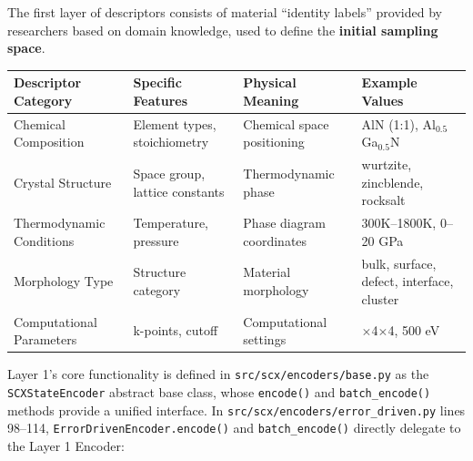 \documentclass[
  12pt,
]{article}
\begin{document}
The first layer of descriptors consists of material ``identity labels'' provided by researchers based on domain knowledge, used to define the \textbf{initial sampling space}.

\begin{longtable}[]{@{}
  >{\raggedright\arraybackslash}p{}
  >{\raggedright\arraybackslash}p{}
  >{\raggedright\arraybackslash}p{}
  >{\raggedright\arraybackslash}p{}@{}}
\toprule\noalign{}
\begin{minipage}[b]{\linewidth}\raggedright
Descriptor Category
\end{minipage} & \begin{minipage}[b]{\linewidth}\raggedright
Specific Features
\end{minipage} & \begin{minipage}[b]{\linewidth}\raggedright
Physical Meaning
\end{minipage} & \begin{minipage}[b]{\linewidth}\raggedright
Example Values
\end{minipage} \\
\midrule\noalign{}
\endhead
\bottomrule\noalign{}
\endlastfoot
Chemical Composition & Element types, stoichiometry & Chemical space positioning & AlN (1:1), Al$_{0.5}$Ga$_{0.5}$N \\
Crystal Structure & Space group, lattice constants & Thermodynamic phase & wurtzite, zincblende, rocksalt \\
Thermodynamic Conditions & Temperature, pressure & Phase diagram coordinates & 300K--1800K, 0--20 GPa \\
Morphology Type & Structure category & Material morphology & bulk, surface, defect, interface, cluster \\
Computational Parameters & k-points, cutoff & Computational settings & 4$\times$4$\times$4, 500 eV \\
\end{longtable}

Layer 1's core functionality is defined in \texttt{src/scx/encoders/base.py} as the \texttt{SCXStateEncoder} abstract base class, whose \texttt{encode()} and \texttt{batch\_encode()} methods provide a unified interface. In \texttt{src/scx/encoders/error\_driven.py} lines 98--114, \texttt{ErrorDrivenEncoder.encode()} and \texttt{batch\_encode()} directly delegate to the Layer 1 Encoder:
\end{document}
